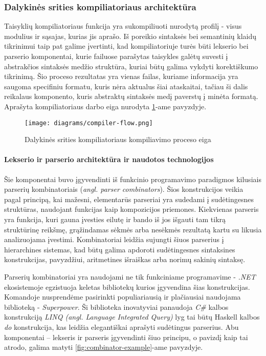 \begin{activities}
{        \subsubsection*{Dalykinės srities kompiliatoriaus architektūra}

        Taisyklių kompiliatoriaus funkcija yra sukompiliuoti nurodytą profilį - visus modulius ir sąsajas, kurias jis aprašo. Iš poreikio sintaksės bei semantinių klaidų tikrinimui taip pat galime įvertinti, kad kompiliatoriuje turės būti lekserio bei parserio komponentai, kurie failuose parašytas taisykles galėtų suvesti į abstrakčios sintaksės medžio struktūra, kuriai būtų galima vykdyti korektiškumo tikrinimą. Šio proceso rezultatas yra vienas failas, kuriame informacija yra saugoma specifiniu formatu, kuris nėra aktualus šiai ataskaitai, tačiau ši dalis reikalaus komponento, kuris abstraktų sintaksės medį paverstų į minėta formatą. Aprašyta kompiliatoriaus darbo eiga nurodyta \ref{fig:compiler-flow}-ame pavyzdyje.

        \begin{figure}
            \centering
            \texttt{[image: diagrams/compiler-flow.png]}
            \caption{Dalykinės srities kompiliatoriaus kompiliavimo proceso eiga}
            \label{fig:compiler-flow}
        \end{figure}

        \paragraph{Lekserio ir parserio architektūra ir naudotos technologijos}

        Šie komponentai buvo įgyvendinti iš funkcinio programavimo paradigmos kilusiais parserių kombinatoriais (\textit{angl. parser combinators}). Šios konstrukcijos veikia pagal principą, kai mažesni, elementarūs parseriai yra sudedami į sudėtingesnes struktūras, naudojant funkcijas kaip kompozicijos priemones. Kiekvienas parseris yra funkcija, kuri gauna įvesties eilutę ir bando iš jos išgauti tam tikrą struktūrinę reikšmę, grąžindamas sėkmės arba nesėkmės rezultatą kartu su likusia analizuojama įvestimi. Kombinatoriai leidžia sujungti šiuos parserius į hierarchines sistemas, kad būtų galima apdoroti sudėtingesnes sintaksines konstrukcijas, pavyzdžiui, aritmetines išraiškas arba norimų sakinių sintaksę. 
        
        Parserių kombinatoriai yra naudojami ne tik funkciniame programavime - \textit{.NET} ekosistemoje egzistuoja keletas bibliotekų kurios įgyvendina šias konstrukcijas. Komandoje nusprendėme pasirinkti populiariausią ir plačiausiai naudojama biblioteką - \textit{Superpower}. Ši biblioteka inovatyviai panaudoja \textit{C\#} kalbos konstrukciją \textit{LINQ (angl. Language Integrated Query)} lyg tai būtų Haskell kalbos \textit{do} konstrukcija, kas leidžia elegantiškai aprašyti sudėtingus parserius. Abu komponentai -- lekseris ir parseris įgyvendinti šiuo principu, o pavizdį kaip tai atrodo, galima matyti \ref{fig:combinator-example}-ame pavyzdyje.

}
\end{activities}
